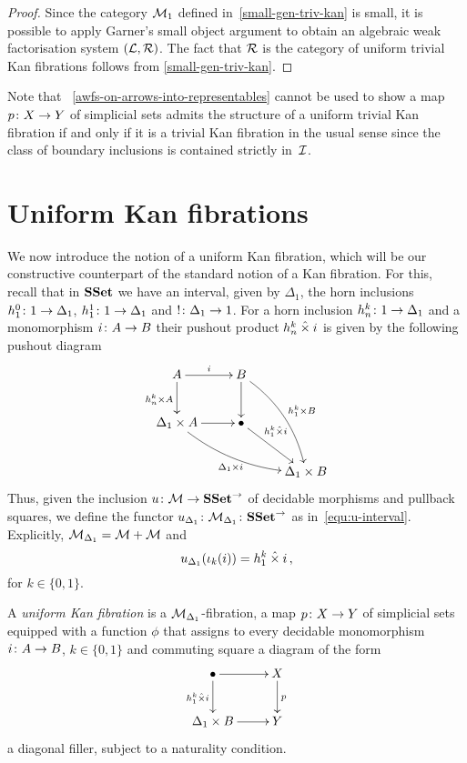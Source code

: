 \documentclass[reqno,10pt,a4paper,oneside]{amsart}
\begin{document}
\begin{proof} Since the category $\cal{M}_1$ defined in~\cref{small-gen-triv-kan} is small,  
it is possible to apply Garner's small object argument to
obtain an algebraic weak factorisation system $(\cal{L}, \cal{R})$.
The fact that $\cal{R}$ is the category of uniform trivial Kan fibrations
 follows from \cref{small-gen-triv-kan}.
 \end{proof} 

Note that ~\cref{awfs-on-arrows-into-representables} cannot be used to show 
a map $p \co X \to Y$ of simplicial sets admits the structure of a uniform trivial Kan fibration if and only if it is a trivial Kan fibration in the usual sense since  the class of boundary inclusions  is contained strictly  in~$\cal{I}$. 




\section{Uniform Kan fibrations}


We now introduce the notion of a uniform Kan fibration, which will be our constructive counterpart
of the standard notion of a Kan fibration. For this, recall that in $\SSet$ we have an interval, given by
$\Delta_1$, the horn inclusions $h^0_1 \co 1 \to \Delta_1$, $h^1_1 \co 1 \to \Delta_1$ and $! \co
\Delta_1 \to 1$. For a horn inclusion $h^{k}_n \co 1 \to \Delta_1$ and  a monomorphism $i \co A \to B$
their pushout product $h^k_n \hattimes i$ is given by the following pushout diagram
\[
\xymatrix{
 A \ar[r]^{i}  \ar[d]_{h^k_n \times A} &  B \ar@/^1em/[ddr]^{h^k_1 \times B} \ar[d] & \\ 
\Delta_1 \times A \ar@/_1em/[drr]_{\Delta_1 \times i} \ar[r] & \bullet \ar[dr]^-(.35){h^k_1 \hattimes i}  & \\ 
 & & \Delta_1 \times B} 
 \]
 Thus, given the inclusion $u \co \cal{M} \to \SSet^\to$ of decidable morphisms and pullback squares, 
 we define the functor $u_{\Delta_1} \co \cal{M}_{\Delta_1} \co \SSet^\to$ as in~\eqref{equ:u-interval}. 
 Explicitly, $ \cal{M}_{\Delta_1} = \cal{M} + \cal{M}$ and
 \[
  u_{\Delta_1} (\iota_k(i)) = h^k_1 \hattimes i \, ,
  \]
  for $k \in \{ 0, 1 \}$. 
   

\begin{definition} A \emph{uniform Kan fibration} is a $\cal{M}_{\Delta_1}$-fibration, \ie 
a map  $p \co X \to Y$ of simplicial sets equipped with a function $\phi$ that assigns
to every decidable monomorphism $i \co A \to B$, $k \in \{0, 1\}$  and commuting
square a diagram of the form
\[
\xymatrix{
\bullet \ar[r] \ar[d]_{h^k_1 \hattimes i} & X \ar[d]^p \\
\Delta_1 \times B \ar[r] & Y }
\]
a diagonal filler, subject to a naturality condition. 
\end{definition} 
\end{document}
